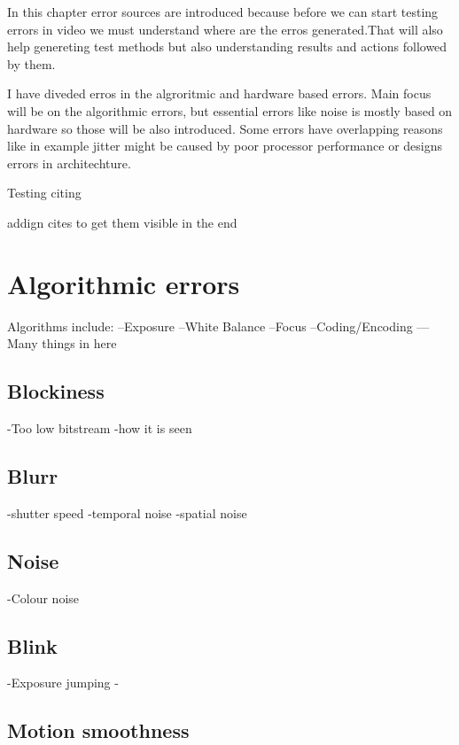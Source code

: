 

In this chapter error sources are introduced because before we can start
testing errors in video we must understand where are the
erros generated.That will also help genereting test methods but also
understanding results and actions followed by them. 

I have diveded erros in the algroritmic and hardware based
errors. Main focus will be on the algorithmic errors, but essential errors
like noise is mostly based on hardware so those will be also introduced. Some
errors have overlapping reasons like in example jitter might be caused by
poor processor performance or designs errors in architechture. 

Testing citing ~\cite{4799375}

addign cites to get them visible in the end
~\cite{5464831}
~\cite{5583037}
~\cite{5583094}
~\cite{5710601}
~\cite{5739529}
~\cite{6081486}
~\cite{6116319}
~\cite{6411890}
~\cite{6467556}
~\cite{6625056}
~\cite{6705673}
~\cite{5605523}
~\cite{5290984}
~\cite{1203346}
~\cite{4803123}
~\cite{4799318}
~\cite{5381595}
~\cite{6229729}
~\cite{4347144}
~\cite{1247211}



\section{Algorithmic errors}
Algorithms include:
--Exposure
--White Balance
--Focus
--Coding/Encoding
---Many things in here

\subsection{Blockiness}
-Too low bitstream
-how it is seen

\subsection{Blurr}
-shutter speed
-temporal noise
-spatial noise
\subsection{Noise}
-Colour noise

\subsection{Blink}
-Exposure jumping
-
\subsection{Motion smoothness}
